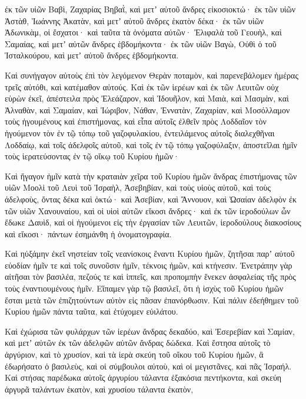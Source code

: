 {ἐκ τῶν υἱῶν Βαβὶ, Ζαχαρίας Βηβαῒ, καὶ μετʼ αὐτοῦ ἄνδρες εἰκοσιοκτώ·
ἐκ τῶν υἱῶν Ἀστὰθ, Ἰωάννης Ἀκατὰν, καὶ μετʼ αὐτοῦ ἄνδρες ἑκατὸν δέκα·
ἐκ τῶν υἱῶν Ἀδωνικὰμ, οἱ ἔσχατοι· καὶ ταῦτα τὰ ὀνόματα αὐτῶν· Ἐλιφαλὰ τοῦ Γεουὴλ, καὶ Σαμαίας, καὶ μετʼ αὐτῶν ἄνδρες ἑβδομήκοντα·
ἐκ τῶν υἱῶν Βαγὼ, Οὐθὶ ὁ τοῦ Ἱσταλκούρου, καὶ μετʼ αὐτοῦ ἄνδρες ἑβδομήκοντα.
\par }{\PP {}Καὶ συνήγαγον αὐτοὺς ἐπὶ τὸν λεγόμενον Θερὰν ποταμὸν, καὶ παρενεβάλομεν ἡμέρας τρεῖς αὐτόθι, καὶ κατέμαθον αὐτούς.
Καὶ ἐκ τῶν ἱερέων καὶ ἐκ τῶν Λευιτῶν οὐχ εὑρὼν ἐκεῖ,
ἀπέστειλα πρὸς Ἐλεάζαρον, καὶ Ἱδουῆλον, καὶ Μαιὰ, καὶ Μασμὰν, καὶ Ἀλναθὰν, καὶ Σαμαίαν, καὶ Ἰώριβον, Νάθαν,
Ἐννατὰν, Ζαχαρίαν, καὶ Μοσόλλαμον τοὺς ἡγουμένους καὶ ἐπιστήμονας,
καὶ εἶπα αὐτοῖς ἐλθεῖν πρὸς Λοδδαῖον τὸν ἡγούμενον τὸν ἐν τῷ τόπῳ τοῦ γαζοφυλακίου,
ἐντειλάμενος αὐτοῖς διαλεχθῆναι Λοδδαίῳ, καὶ τοῖς ἀδελφοῖς αὐτοῦ, καὶ τοῖς ἐν τῷ τόπῳ γαζοφύλαξιν, ἀποστεῖλαι ἡμῖν τοὺς ἱερατεύσοντας ἐν τῷ οἴκῳ τοῦ Κυρίου ἡμῶν·
\par }{\PP {}Καὶ ἤγαγον ἡμῖν κατὰ τὴν κραταιὰν χεῖρα τοῦ Κυρίου ἡμῶν ἄνδρας ἐπιστήμονας τῶν υἱῶν Μοολὶ τοῦ Λευὶ τοῦ Ἰσραὴλ, Ἀσεβηβίαν, καὶ τοὺς υἱοὺς αὐτοῦ, καὶ τοὺς ἀδελφοὺς, ὄντας δέκα καὶ ὀκτώ·
καὶ Ἀσεβίαν, καὶ Ἄννουον, καὶ Ὠσαίαν ἀδελφὸν ἐκ τῶν υἱῶν Χανουναίου, καὶ οἱ υἱοὶ αὐτῶν εἴκοσι ἄνδρες·
καὶ ἐκ τῶν ἱεροδούλων ὧν ἔδωκε Δαυὶδ, καὶ οἱ ἡγούμενοι εἰς τὴν ἐργασίαν τῶν Λευιτῶν, ἱεροδούλους διακοσίους καὶ εἴκοσι· πάντων ἐσημάνθη ἡ ὀνοματογραφία.
\par }{\PP {}Καὶ ηὐξάμην ἐκεῖ νηστείαν τοῖς νεανίσκοις ἔναντι Κυρίου ἡμῶν, ζητῆσαι παρʼ αὐτοῦ εὐοδίαν ἡμῖν τε καὶ τοῖς συνοῦσιν ἡμῖν, τέκνοις ἡμῶν, καὶ κτήνεσιν.
Ἐνετράπην γὰρ αἰτῆσαι τὸν βασιλέα, πεζούς τε καὶ ἱππεῖς, και προπομπὴν ἕνεκεν ἀσφαλείας τῆς πρὸς τοὺς ἐναντιουμένους ἡμῖν.
Εἴπαμεν γὰρ τῷ βασιλεῖ, ὅτι ἡ ἰσχὺς τοῦ Κυρίου ἡμῶν ἔσται μετὰ τῶν ἐπιζητούντων αὐτὸν εἰς πᾶσαν ἐπανόρθωσιν.
Καὶ πάλιν ἐδεήθημεν τοῦ Κυρίου ἡμῶν πάντα ταῦτα, καὶ ἐτύχομεν εὐιλάτου.
\par }{\PP {}Καὶ ἐχώρισα τῶν φυλάρχων τῶν ἱερέων ἄνδρας δεκαδύο, καὶ Ἐσερεβίαν καὶ Σαμίαν, καὶ μετʼ αὐτῶν ἐκ τῶν ἀδελφῶν αὐτῶν ἄνδρας δώδεκα.
Καὶ ἔστησα αὐτοῖς τὸ ἀργύριον, καὶ τὸ χρυσίον, καὶ τὰ ἱερὰ σκεύη τοῦ οἴκου τοῦ Κυρίου ἡμῶν, ἃ ἐδωρήσατο ὁ βασιλεὺς, καὶ οἱ σύμβουλοι αὐτοὺ, καὶ οἱ μεγιστᾶνες, καὶ πᾶς Ἰσραήλ.
Καὶ στήσας παρέδωκα αὑτοῖς ἀργυρίου τάλαντα ἑξακόσια πεντήκοντα, καὶ σκεύη ἀργυρᾶ ταλάντων ἑκατὸν, καὶ χρυσίου τάλαντα ἑκατὸν,
}
